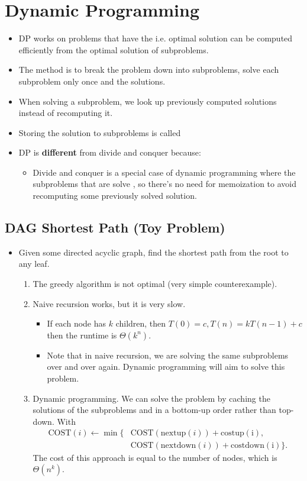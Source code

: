 \documentclass[a4paper,12pt]{article}
\begin{document}
\section{Dynamic Programming}
\begin{itemize}
    \item DP works on problems that have the  i.e. optimal solution can be computed efficiently from the optimal solution of subproblems.
    \item The method is to break the problem down into subproblems, solve each subproblem only once and  the solutions.
    \item When solving a subproblem, we look up previously computed solutions instead of recomputing it.
    \item Storing the solution to subproblems is called 
    \item DP is \textbf{different} from divide and conquer because:
    \begin{itemize}
        \item Divide and conquer is a special case of dynamic programming where the subproblems that are solve , so there's no need for memoization to avoid recomputing some previously solved solution.
    \end{itemize}
\end{itemize}
\subsection{DAG Shortest Path (Toy Problem)}
\begin{itemize}
    \item Given some directed acyclic graph, find the shortest path from the root to any leaf.
    \begin{enumerate}
        \item The greedy algorithm is not optimal (very simple counterexample).
        \item Naive recursion works, but it is very slow.
        \begin{itemize}
            \item If each node has $k$ children, then $T(0)=c,T(n)=kT(n-1)+c$ then the runtime is $\Theta(k^n)$.
            \item Note that in naive recursion, we are solving the same subproblems over and over again. Dynamic programming will aim to solve this problem.
        \end{itemize}
        \item Dynamic programming. We can solve the problem by caching the solutions of the subproblems and in a bottom-up order rather than top-down. With \begin{align}
            \mathrm{COST}(i)\gets\min\{&\mathrm{COST}(\mathrm{nextup}(i))+\mathrm{costup(i)},\\&\mathrm{COST}(\mathrm{nextdown}(i))+\mathrm{costdown(i)}\}.
        \end{align}
        The cost of this approach is equal to the number of nodes, which is $\Theta(n^k).$
    \end{enumerate}
\end{itemize}
\end{document}
